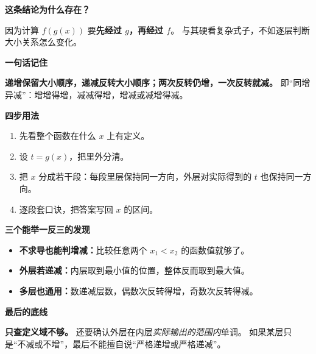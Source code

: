 \clearpage
\begin{summarybox}
\textbf{\textcolor{CSummary}{这条结论为什么存在？}}

因为计算 $f(g(x))$ 要\textbf{先经过 $g$，再经过 $f$}。
与其硬看复杂式子，不如逐层判断大小关系怎么变化。

\medskip
\textbf{\textcolor{CSummary}{一句话记住}}

\textbf{递增保留大小顺序，递减反转大小顺序；两次反转仍增，一次反转就减。}
即“同增异减”：增增得增，减减得增，增减或减增得减。

\medskip
\textbf{\textcolor{CSummary}{四步用法}}
\begin{enumerate}[leftmargin=*, itemsep=0.25em]
\item 先看整个函数在什么 $x$ 上有定义。
\item 设 $t=g(x)$，把里外分清。
\item 把 $x$ 分成若干段：每段里层保持同一方向，外层对实际得到的 $t$ 也保持同一方向。
\item 逐段套口诀，把答案写回 $x$ 的区间。
\end{enumerate}

\medskip
\textbf{\textcolor{CSummary}{三个能举一反三的发现}}
\begin{itemize}[leftmargin=*, itemsep=0.25em]
\item \textbf{不求导也能判增减：}比较任意两个 $x_1<x_2$ 的函数值就够了。
\item \textbf{外层若递减：}内层取到最小值的位置，整体反而取到最大值。
\item \textbf{多层也通用：}数递减层数，偶数次反转得增，奇数次反转得减。
\end{itemize}

\medskip
\textbf{\textcolor{CSummary}{最后的底线}}

\textbf{只查定义域不够。} 还要确认外层在内层\emph{实际输出的范围内}单调。
如果某层只是“不减或不增”，最后不能擅自说“严格递增或严格递减”。
\end{summarybox}
